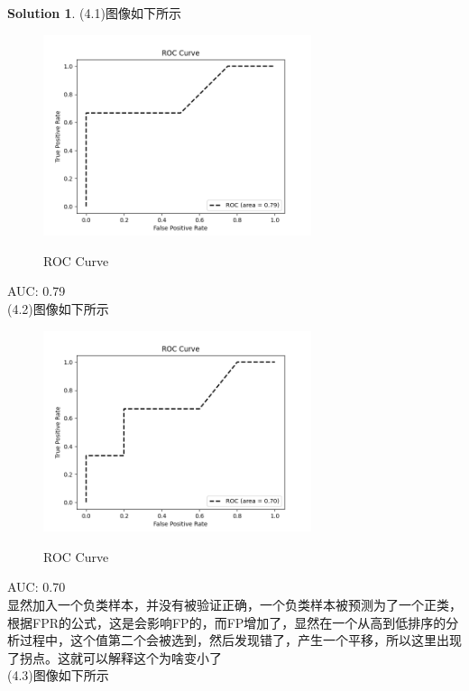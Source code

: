 \documentclass[a4paper,UTF8]{article}
\numberwithin{equation}{section}
\theoremstyle{definition}
\newtheorem*{solution}{Solution}
\begin{document}
\begin{solution}
    (4.1)图像如下所示\\
    \begin{figure}[H]
        \centering
        \includegraphics[width=0.7\textwidth]{roc_drawing.png}\\
        \caption{ROC Curve}
        \label{fig:roc_drawing}
    \end{figure}
    AUC: 0.79\\
    (4.2)图像如下所示\\
    \begin{figure}[H]
        \centering
        \includegraphics[width=0.7\textwidth]{roc_drawing1.png}\\
        \caption{ROC Curve}
        \label{fig:roc_drawing_0.8}
    \end{figure}
    AUC: 0.70\\
    显然加入一个负类样本，并没有被验证正确，一个负类样本被预测为了一个正类，根据FPR的公式，这是会影响FP的，而FP增加了，显然在一个从高到低排序的分析过程中，这个值第二个会被选到，然后发现错了，产生一个平移，所以这里出现了拐点。这就可以解释这个为啥变小了\\
    (4.3)图像如下所示\\

\end{solution}
\end{document}
